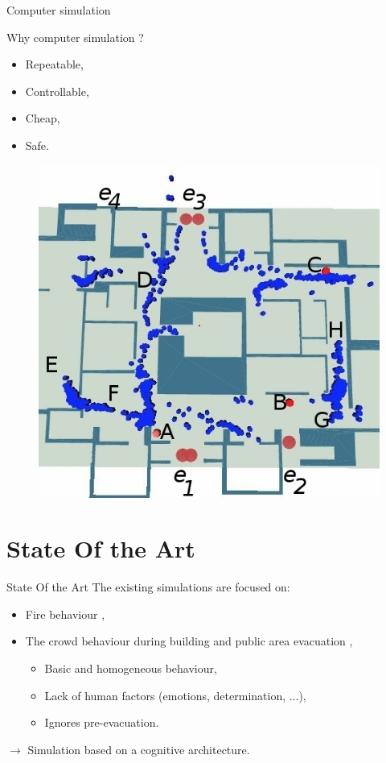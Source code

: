 \documentclass{beamer}
\begin{document}
  \begin{frame}{Computer simulation}
    \begin{block}{Why computer simulation ?}
      \begin{itemize}
        \item Repeatable,
        \item Controllable,
        \item Cheap,
        \item Safe.
      \end{itemize}
    \end{block}
		\begin{figure}[h]
			\includegraphics[scale=0.4]{eva2.jpg}
		\end{figure}
  \end{frame}

  \section{State Of the Art}

    \begin{frame}{State Of the Art}
      The existing simulations are focused on:
      \begin{itemize}
				\item Fire behaviour \cite{phoenix},
        \item The crowd behaviour during building and public area evacuation \cite{modeling2008,human2006,crowd2005},
				\begin{itemize}
					\item Basic and homogeneous behaviour,
					\item Lack of human factors (emotions, determination, ...),
					\item Ignores pre-evacuation.
				\end{itemize}
      \end{itemize}
			\vspace{2em}
			$\rightarrow$ Simulation based on a cognitive architecture.
    \end{frame}
\end{document}
